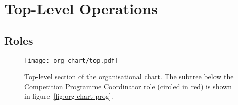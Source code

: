 \chapter{Top-Level Operations}

\section{Roles}
\begin{landscape}
  \begin{figure}
    \begin{center}
      \texttt{[image: org-chart/top.pdf]}
    \end{center}
    \caption{\label{fig:org-chart-top}Top-level section of the organisational chart.  The subtree below the Competition Programme Coordinator role (circled in red) is shown in figure~\ref{fig:org-chart-prog}.}
  \end{figure}
\end{landscape}
